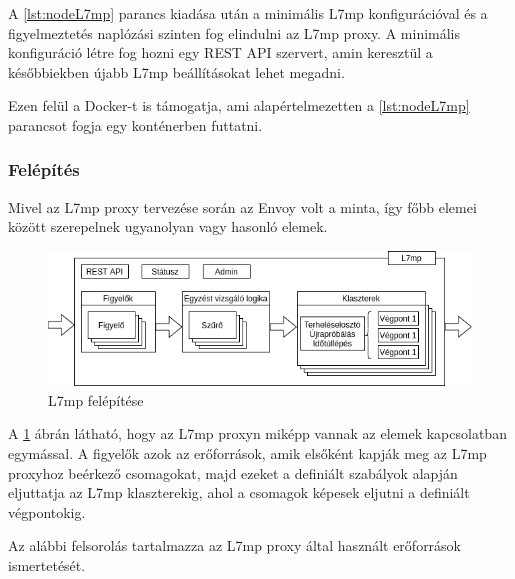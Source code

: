 A \ref{lst:nodeL7mp} parancs kiadása után a minimális L7mp konfigurációval és a 
figyelmeztetés naplózási szinten fog elindulni az L7mp proxy. A minimális konfiguráció 
létre fog hozni egy REST API szervert, amin keresztül a későbbiekben újabb L7mp 
beállításokat lehet megadni.

Ezen felül a Docker-t is támogatja, ami alapértelmezetten a \ref{lst:nodeL7mp} parancsot 
fogja egy konténerben futtatni.

\subsubsection{Felépítés}

Mivel az L7mp proxy tervezése során az Envoy volt a minta, így főbb elemei között 
szerepelnek ugyanolyan vagy hasonló elemek. 

\begin{figure}[!ht]
	\centering
	\includegraphics[width=1\textwidth, keepaspectratio]{figures/l7mp_struct.png}
	\caption{L7mp felépítése}
	\label{fig:l7mpStruct}
\end{figure}

A \ref{fig:l7mpStruct} ábrán látható, hogy az L7mp proxyn miképp vannak az elemek kapcsolatban egymással. A figyelők azok az erőforrások, amik elsőként kapják meg az L7mp proxyhoz beérkező csomagokat, majd ezeket a definiált szabályok alapján eljuttatja az L7mp klaszterekig, ahol a csomagok képesek eljutni a definiált végpontokig. 

Az alábbi felsorolás tartalmazza az L7mp proxy által használt erőforrások ismertetését.

